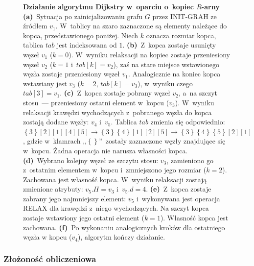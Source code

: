 \begin{figure}[!htbp]
\begin{subfigure}[b]{\textwidth}
\begin{subfigure}[b]{0.325\textwidth}
			\caption{}
			\label{fig:exampleDHeap:f}
		\end{subfigure}
		\hfill\null
	\end{subfigure}
	\caption{
		\textbf{Działanie algorytmu Dijkstry w~oparciu o~kopiec $R$-arny}
		\textbf{(a)}~Sytuacja po zainicjalizowaniu grafu $G$ przez \textsf{INIT-GRAH} ze źródłem $v_{1}$.
		W~tablicy na szaro zaznaczone są elementy należące do kopca, przedstawionego poniżej.
		Niech $k$ oznacza rozmiar kopca, tablica $tab$ jest indeksowana od $1$.
		\textbf{(b)}~Z~kopca zostaje usunięty węzeł $v_{1}$ ($k=0$).
		W~wyniku relaksacji na kopiec zostaje przeniesiony węzeł $v_{2}$ ($k=1$ i~$tab \left[ k \right] = v_{2}$), zaś na stare miejsce wstawionego węzła zostaje przeniesiony węzeł $v_{1}$.
		Analogicznie na koniec kopca wstawiany jest $v_{3}$  ($k=2$, $tab \left[ k \right] = v_{3}$), w~wyniku czego $tab \left[ 3 \right] = v_{1}$.
		\textbf{(c)}~Z~kopca zostaje pobrany węzeł $v_{2}$, a~na szczyt stosu~--- przeniesiony ostatni element w~kopcu ($v_{3}$).
		W~wyniku relaksacji krawędzi wychodzących z~pobranego węzła do kopca zostają dodane węzły: $v_{4}$ i~$v_{5}$.
		Tablica $tab$ zmienia się odpowiednio: $\left\{ 3 \right\} \left[ 2 \right]  \left[ 1 \right]  \left[ 4 \right]  \left[ 5 \right] \rightarrow \left\{ 3 \right\} \left\{ 4 \right\}  \left[ 1 \right]  \left[ 2 \right]  \left[ 5 \right] \rightarrow \left\{ 3 \right\} \left\{ 4 \right\}  \left\{ 5 \right\}  \left[ 2 \right]  \left[ 1 \right]$, gdzie w~klamrach ,,$\left\{\right\}$''~zostały zaznaczone węzły znajdujące się w~kopcu.
		Żadna operacja nie narusza własności kopca.
		\textbf{(d)}~Wybrano kolejny węzeł ze szczytu stosu: $v_{3}$, zamieniono go z~ostatnim elementem w~kopcu i~zmniejszono jego rozmiar ($k=2$).
		Zachowana jest własność kopca.
		W~wyniku relaksacji zostają zmienione atrybuty: $v_{5}.\Pi = v_{3}$ i~$v_{5}.d = 4$.
		\textbf{(e)}~Z~kopca zostaje zabrany jego najmniejszy element: $v_{5}$ i~wykonywana jest operacja \textsf{RELAX} dla krawędzi z~niego wychodzących.
		Na szczyt kopca zostaje wstawiony jego ostatni element ($k=1$).
		Własność kopca jest zachowana.
		\textbf{(f)}~Po wykonaniu analogicznych kroków dla ostatniego węzła w kopcu ($v_{4}$), algorytm kończy działanie.
	}
	\label{fig:exampleDHeap}
\end{figure}


\subsubsection{Złożoność obliczeniowa}


